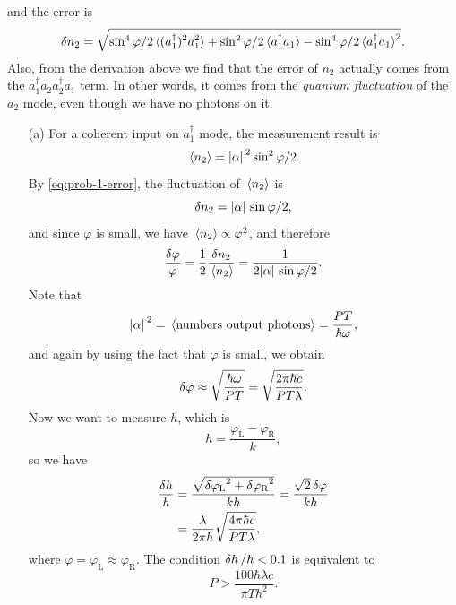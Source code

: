 \documentclass[hyperref, a4paper]{article}
\begin{document}
and the error is 
\begin{equation}
    \var{n_2} = \sqrt{\sin^4 \varphi / 2 \expval*{(a_1^\dagger)^2 a_1^2} + \sin^2 \varphi / 2 \expval*{a_1^\dagger a_1} - \sin^4 \varphi / 2 \expval*{a_1^\dagger a_1}^2}.
    \label{eq:prob-1-error}
\end{equation}
Also, from the derivation above we find that the error of $n_2$ actually comes from 
the $a_1^\dagger a_2 a_2^\dagger a_1$ term. In other words, it comes from the \emph{quantum fluctuation} 
of the $a_2$ mode, even though we have no photons on it. 

\begin{itemize}
\item[(a)] For a coherent input on $a_1^\dagger$ mode, the measurement result is 
\begin{equation}
    \expval*{n_2} = \abs*{\alpha}^2 \sin^2 \varphi / 2.
\end{equation} 
By \eqref{eq:prob-1-error}, the fluctuation of $\expval*{n_2}$ is 
\[
    \var{n_2} = \abs*{\alpha} \sin \varphi / 2 ,
\]
and since $\varphi$ is small, we have $\expval*{n_2} \propto \varphi^2$, and therefore 
\begin{equation}
    \frac{\var{\varphi}}{\varphi} = \frac{1}{2} \frac{\var{n_2}}{\expval*{n_2}} = \frac{1}{2 \abs*{\alpha} \sin \varphi / 2}.
    \label{eq:prob-2-phi-error-1}
\end{equation}
Note that 
\[
    \abs*{\alpha}^2 = \expval*{\text{numbers output photons}} = \frac{PT}{\hbar \omega}, 
\]
and again by using the fact that $\varphi$ is small, we obtain 
\begin{equation}
    \var{\varphi} \approx \sqrt{\frac{\hbar \omega}{PT}} 
    = \sqrt{\frac{2 \pi \hbar c}{PT \lambda}}. 
\end{equation}
Now we want to measure $h$, which is 
\begin{equation}
    h = \frac{\varphi_\text{L} - \varphi_\text{R}}{k}, 
\end{equation}
so we have 
\begin{equation}
    \begin{aligned}
        \frac{\var{h}}{h} &= \frac{\sqrt{\var{\varphi_\text{L}}^2 + \var{\varphi_\text{R}}^2}}{k h} = \frac{\sqrt{2} \var{\varphi} }{k h} \\
        &= \frac{\lambda}{2 \pi h} \sqrt{\frac{4 \pi \hbar c}{P T \lambda}},
    \end{aligned}
\end{equation}
where $\varphi = \varphi_\text{L} \approx \varphi_\text{R}$.
The condition $\var{h} / h < 0.1$ is equivalent to 
\begin{equation}
    P > \frac{100 \hbar \lambda c}{\pi T h^2}.
    \label{eq:prob-2-condition}
\end{equation}


\end{itemize}
\end{document}
